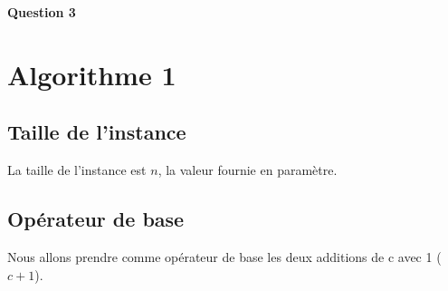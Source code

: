 \documentclass[class=article]{standalone}
\begin{document}
\centerline{\Huge \bf Question 3}
\section*{Algorithme 1}
\subsection*{Taille de l'instance}
La taille de l'instance est $n$, la valeur fournie en paramètre.

\subsection*{Opérateur de base}
Nous allons prendre comme opérateur de base les deux additions de c avec 1 ($c+1$).
\end{document}
